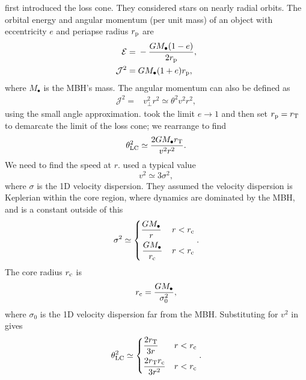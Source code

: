 \citet{Frank1976} first introduced the loss cone. They considered stars on nearly radial orbits. The orbital energy and angular momentum (per unit mass) of an object with eccentricity $e$ and periapse radius $r_\mathrm{p}$ are
\begin{align}
\mathcal{E} = {} & -\dfrac{GM_\bullet(1 - e)}{2r_\mathrm{p}}, \\
\mathcal{J}^2 = {} & GM_\bullet(1 + e)r_\mathrm{p},
\end{align}
where $M_\bullet$ is the MBH's mass. The angular momentum can also be defined as
\begin{align}
\mathcal{J}^2 = {} & v_\perp^2r^2 \simeq \theta^2v^2r^2,
\end{align}
using the small angle approximation. \citet{Frank1976} took the limit $e \rightarrow 1$ and then set $r_\mathrm{p} = r_\mathrm{T}$ to demarcate the limit of the loss cone; we rearrange to find
\begin{equation}
\theta_\mathrm{LC}^2 \simeq \dfrac{2GM_\bullet r_\mathrm{T}}{v^2r^2}.
\label{eq:LC-FR}
\end{equation}
We need to find the speed at $r$. \citet{Frank1976} used a typical value
\begin{equation}
v^2 \simeq 3\sigma^2,
\end{equation}
where $\sigma$ is the 1D velocity dispersion. They assumed the velocity dispersion is Keplerian within the core region, where dynamics are dominated by the MBH, and is a constant outside of this
\begin{equation}
\sigma^2 \simeq \begin{cases}
\displaystyle \dfrac{GM_\bullet}{r} & r < r\sub{c} \vspace{0.4\normalbaselineskip} \\
\displaystyle \left. \dfrac{GM_\bullet}{r\sub{c}} \right. & r < r\sub{c}
\end{cases}.
\end{equation}
The core radius $r_\mathrm{c}$ is
\begin{equation}
r_\mathrm{c} = \dfrac{GM_\bullet}{\sigma_0^2},
\end{equation}
where $\sigma_0$ is the 1D velocity dispersion far from the MBH. Substituting for $v^2$ in  gives
\begin{align}
\theta\sub{LC}^2 \simeq \begin{cases}
\displaystyle \dfrac{2r\sub{T}}{3r} & r < r\sub{c} \vspace{0.4\normalbaselineskip} \\
\displaystyle \dfrac{2r\sub{T}r\sub{c}}{3r^2} & r < r\sub{c}
\end{cases}.
\label{eq:FR-LC}
\end{align}

